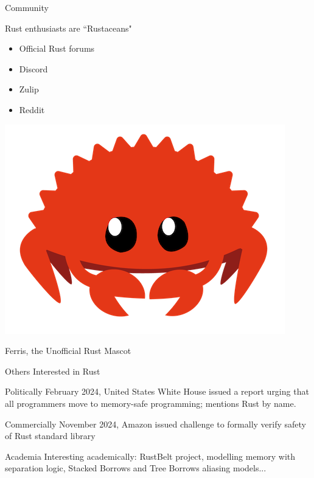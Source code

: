 \documentclass{beamer}
\begin{document}
\begin{frame}{Community} 
\begin{block}{Rust enthusiasts are ``Rustaceans"}
\begin{itemize}[label=$\bullet$] 
\item Official Rust forums
\item Discord
\item Zulip
\item Reddit
\end{itemize}
\end{block}
\begin{center}
\includegraphics[scale=0.1]{cuddlyferris}

Ferris, the Unofficial Rust Mascot
\end{center}
\end{frame}


\begin{frame}{Others Interested in Rust}
\pause
\begin{block}{Politically} 
February 2024, United States White House issued a report urging that all programmers move to memory-safe programming; mentions Rust by name.
\end{block} 
\pause
\begin{block}{Commercially} 
November 2024, Amazon issued challenge to formally verify safety of Rust standard library
\end{block}
\pause
\begin{block}{Academia} 
Interesting academically: RustBelt project, modelling memory with separation logic, 
Stacked Borrows and Tree Borrows aliasing models...
\end{block} 
\end{frame} 
\end{document}
